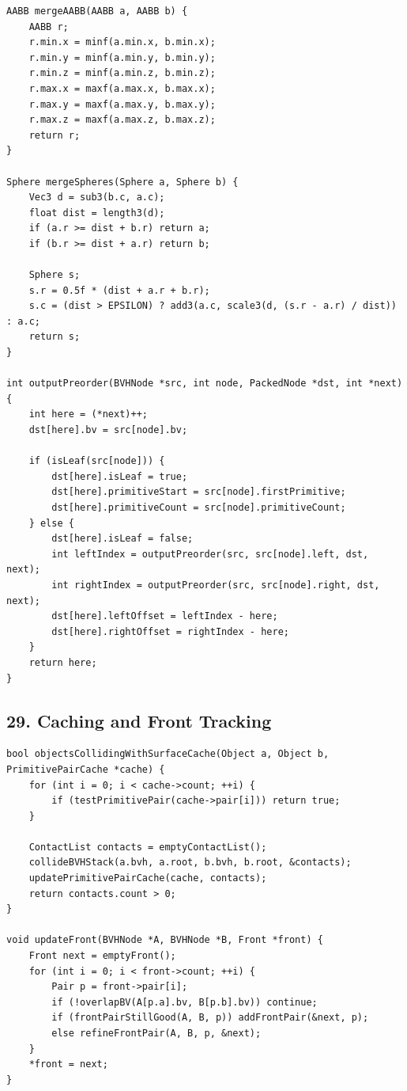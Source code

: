 \documentclass[10pt,letterpaper]{article}
\begin{document}
\begin{verbatim}
AABB mergeAABB(AABB a, AABB b) {
    AABB r;
    r.min.x = minf(a.min.x, b.min.x);
    r.min.y = minf(a.min.y, b.min.y);
    r.min.z = minf(a.min.z, b.min.z);
    r.max.x = maxf(a.max.x, b.max.x);
    r.max.y = maxf(a.max.y, b.max.y);
    r.max.z = maxf(a.max.z, b.max.z);
    return r;
}

Sphere mergeSpheres(Sphere a, Sphere b) {
    Vec3 d = sub3(b.c, a.c);
    float dist = length3(d);
    if (a.r >= dist + b.r) return a;
    if (b.r >= dist + a.r) return b;

    Sphere s;
    s.r = 0.5f * (dist + a.r + b.r);
    s.c = (dist > EPSILON) ? add3(a.c, scale3(d, (s.r - a.r) / dist)) : a.c;
    return s;
}

int outputPreorder(BVHNode *src, int node, PackedNode *dst, int *next) {
    int here = (*next)++;
    dst[here].bv = src[node].bv;

    if (isLeaf(src[node])) {
        dst[here].isLeaf = true;
        dst[here].primitiveStart = src[node].firstPrimitive;
        dst[here].primitiveCount = src[node].primitiveCount;
    } else {
        dst[here].isLeaf = false;
        int leftIndex = outputPreorder(src, src[node].left, dst, next);
        int rightIndex = outputPreorder(src, src[node].right, dst, next);
        dst[here].leftOffset = leftIndex - here;
        dst[here].rightOffset = rightIndex - here;
    }
    return here;
}
\end{verbatim}


\subsection*{29. Caching and Front Tracking}

\begin{verbatim}
bool objectsCollidingWithSurfaceCache(Object a, Object b, PrimitivePairCache *cache) {
    for (int i = 0; i < cache->count; ++i) {
        if (testPrimitivePair(cache->pair[i])) return true;
    }

    ContactList contacts = emptyContactList();
    collideBVHStack(a.bvh, a.root, b.bvh, b.root, &contacts);
    updatePrimitivePairCache(cache, contacts);
    return contacts.count > 0;
}

void updateFront(BVHNode *A, BVHNode *B, Front *front) {
    Front next = emptyFront();
    for (int i = 0; i < front->count; ++i) {
        Pair p = front->pair[i];
        if (!overlapBV(A[p.a].bv, B[p.b].bv)) continue;
        if (frontPairStillGood(A, B, p)) addFrontPair(&next, p);
        else refineFrontPair(A, B, p, &next);
    }
    *front = next;
}
\end{verbatim}
\end{document}
